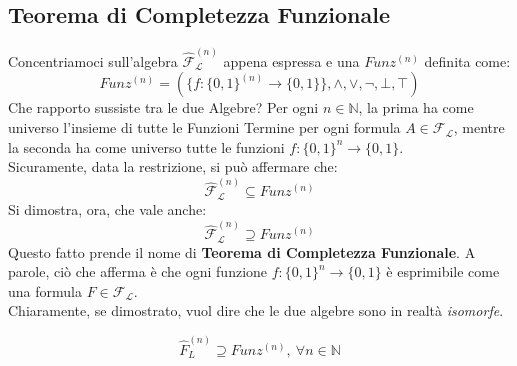 \subsection{Teorema di Completezza Funzionale}
Concentriamoci sull'algebra $\hat{\mathscr{F}}_\mathscr{L}^{(n)}$ appena espressa e una $Funz^{(n)}$ definita come:
$$
Funz^{(n)} = (\{f: \{0,1\}^{(n)} \rightarrow \{0,1\}\}, \land, \lor, \neg, \bot, \top)
$$
Che rapporto sussiste tra le due Algebre?
Per ogni $n \in \mathbb{N}$, la prima ha come universo l'insieme di tutte le Funzioni Termine per ogni formula $A \in \mathscr{F_L}$, mentre la seconda ha come universo tutte le funzioni $f: \{0,1\}^n \rightarrow \{0,1\}$. \\
Sicuramente, data la restrizione, si può affermare che:
$$
\hat{\mathscr{F}}_\mathscr{L}^{(n)} \subseteq Funz^{(n)}
$$
Si dimostra, ora, che vale anche:
$$
\hat{\mathscr{F}}_\mathscr{L}^{(n)} \supseteq Funz^{(n)}
$$
Questo fatto prende il nome di \textbf{Teorema di Completezza Funzionale}. 
A parole, ciò che afferma è che ogni funzione $f: \{0,1\}^n \rightarrow \{0,1\}$ è esprimibile come una formula $F \in \mathscr{F_L}$. \\
Chiaramente, se dimostrato, vuol dire che le due algebre sono in realtà \textit{isomorfe}. 
\begin{teo}
$$
  \hat{F}_L^{(n)} \supseteq Funz^{(n)},\ \forall n \in \mathbb{N}
$$
\end{teo}


